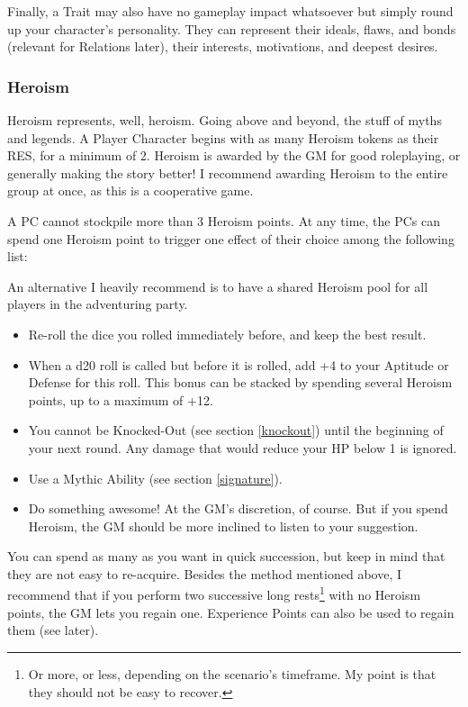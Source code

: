 Finally, a Trait may also have no gameplay impact whatsoever but simply round up your character's personality. They can represent their ideals, flaws, and bonds (relevant for Relations later), their interests, motivations, and deepest desires.

\subsubsection{Heroism}

\label{heroism}

Heroism represents, well, heroism. Going above and beyond, the stuff of myths and legends. A Player Character begins with as many Heroism tokens as their RES, for a minimum of 2. Heroism is awarded by the GM for good roleplaying, or generally making the story better! I recommend awarding Heroism to the entire group at once, as this is a cooperative game. 

A PC cannot stockpile more than 3 Heroism points. At any time, the PCs can spend one Heroism point to trigger one effect of their choice among the following list:


An alternative I heavily recommend is to have a shared Heroism pool for all players in the adventuring party.


\begin{itemize}
    \item Re-roll the dice you rolled immediately before, and keep the best result.
    \item When a d20 roll is called but before it is rolled, add +4 to your Aptitude or Defense for this roll. This bonus can be stacked by spending several Heroism points, up to a maximum of +12.
    \item You cannot be Knocked-Out (see section \ref{knockout}) until the beginning of your next round. Any damage that would reduce your HP below 1 is ignored.
    \item Use a Mythic Ability (see section \ref{signature}).
    \item Do something awesome! At the GM's discretion, of course. But if you spend Heroism, the GM should be more inclined to listen to your suggestion.
\end{itemize}

You can spend as many as you want in quick succession, but keep in mind that they are not easy to re-acquire. Besides the method mentioned above, I recommend that if you perform two successive long rests\footnote{Or more, or less, depending on the scenario's timeframe. My point is that they should not be easy to recover.} with no Heroism points, the GM lets you regain one. Experience Points can also be used to regain them (see later).

